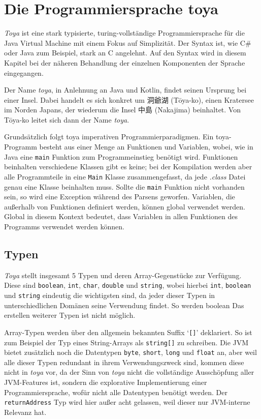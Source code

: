 \chapter{Die Programmiersprache toya}
\label{cha:toya}

\textit{Toya} ist eine stark typisierte, turing-vollständige Programmiersprache für die Java Virtual Machine mit einem Fokus auf Simplizität. Der Syntax ist, wie C\# oder Java zum Beispiel, stark an C angelehnt. Auf den Syntax wird in diesem Kapitel bei der näheren Behandlung der einzelnen Komponenten der Sprache eingegangen. 

\begin{CJK}{UTF8}{ipxm}
Der Name \textit{toya}, in Anlehnung an Java und Kotlin, findet seinen Ursprung bei einer Insel. Dabei handelt es sich konkret um 洞爺湖 (Tōya-ko), einen Kratersee im Norden Japans, der wiederum die Insel 中島 (Nakajima) beinhaltet. Von Tōya-ko leitet sich dann der Name \textit{toya}.
\end{CJK}

Grundsätzlich folgt toya imperativen Programmierparadigmen. Ein toya-Programm besteht aus einer Menge an Funktionen und Variablen, wobei, wie in Java eine \texttt{main} Funktion zum Programmeinstieg benötigt wird. Funktionen beinhalten verschiedene  Klassen gibt es keine; bei der Kompilation werden aber alle Programmteile in eine \texttt{Main} Klasse zusammengefasst, da jede \textit{.class} Datei genau eine Klasse beinhalten muss. Sollte die \texttt{main} Funktion nicht vorhanden sein, so wird eine Exception während des Parsens geworfen. Variablen, die außerhalb von Funktionen definiert werden, können global verwendet werden. Global in diesem Kontext bedeutet, dass Variablen in allen Funktionen des Programms verwendet werden können. 

\section{Typen}

\textit{Toya} stellt insgesamt 5 Typen und deren Array-Gegenstücke zur Verfügung. Diese sind \texttt{boolean}, \texttt{int}, \texttt{char}, \texttt{double} und \texttt{string}, wobei hierbei \texttt{int}, \texttt{boolean} und \texttt{string} eindeutig die wichtigsten sind, da jeder dieser Typen in unterschiedlichen Domänen seine Verwendung findet. So werden boolean  Das erstellen weiterer Typen ist nicht möglich.

Array-Typen werden über den allgemein bekannten Suffix `\texttt{[]}' deklariert. So ist zum Beispiel der Typ eines String-Arrays als \texttt{string[]} zu schreiben. Die JVM bietet zusätzlich noch die Datentypen \texttt{byte}, \texttt{short}, \texttt{long} und \texttt{float} an, aber weil alle dieser Typen redundant in ihrem Verwendungszweck sind, kommen diese nicht in \textit{toya} vor, da der Sinn von \textit{toya} nicht die vollständige Ausschöpfung aller JVM-Features ist, sondern die explorative Implementierung einer Programmiersprache, wofür nicht alle Datentypen benötigt werden. Der \texttt{returnAddress} Typ wird hier außer acht gelassen, weil dieser nur JVM-interne Relevanz hat.

